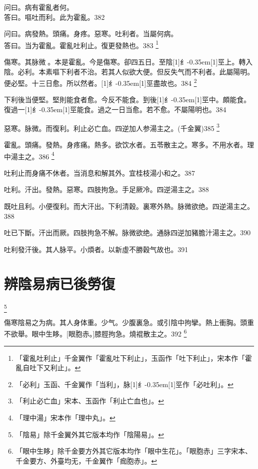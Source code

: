 \documentclass[11pt,oneside,b5paper]{ctexbook}
\begin{document}
\begin{flushleft}
问曰。病有霍亂者何。\\
答曰。嘔吐而利。此为霍亂。382

问曰。病發熱。頭痛。身疼。惡寒。吐利者。当屬何病。\\
答曰。当为霍亂。霍亂吐利止。復更發熱也。383
\footnote{「霍亂吐利止」千金翼作「霍亂吐下利止」，玉函作「吐下利止」，宋本作「霍亂自吐下又利止」。}

傷寒。其脉微{𬈧}。本是霍亂。今是傷寒。卻四五日。至陰{\hbox{\scalebox{0.68}[1]{纟}\kern-0.35em\scalebox{0.64}[1]{巠}}}上。轉入陰。必利。本素嘔下利者不治。若其人似欲大便。但反失气而不利者。此屬陽明。便必堅。十三日愈。所以然者。{\hbox{\scalebox{0.68}[1]{纟}\kern-0.35em\scalebox{0.64}[1]{巠}}}盡故也。384
\footnote{「必利」玉函、千金翼作「当利」，脉{\hbox{\scalebox{0.68}[1]{纟}\kern-0.35em\scalebox{0.64}[1]{巠}}}作「必吐利」。}

下利後当便堅。堅則能食者愈。今反不能食。到後{\hbox{\scalebox{0.68}[1]{纟}\kern-0.35em\scalebox{0.64}[1]{巠}}}中。頗能食。復過一{\hbox{\scalebox{0.68}[1]{纟}\kern-0.35em\scalebox{0.64}[1]{巠}}}能食。過之一日当愈。若不愈。不屬陽明也。384

惡寒。脉微。而復利。利止必亡血。四逆加人参湯主之。(千金翼)385
\footnote{「利止必亡血」宋本、玉函作「利止亡血也」。}

霍亂。頭痛。發熱。身疼痛。熱多。欲饮水者。五苓散主之。寒多。不用水者。理中湯主之。386
\footnote{「理中湯」宋本作「理中丸」。}

吐利止而身痛不休者。当消息和解其外。宜桂枝湯小和之。387

吐利。汗出。發熱。惡寒。四肢拘急。手足厥冷。四逆湯主之。388

既吐且利。小便復利。而大汗出。下利清穀。裏寒外熱。脉微欲绝。四逆湯主之。388

吐已下斷。汗出而厥。四肢拘急不解。脉微欲绝。通脉四逆加豬膽汁湯主之。390

吐利發汗後。其人脉平。小煩者。以新虛不勝穀气故也。391

\chapter{辨陰易病已後勞復}

\footnote{「陰易」除千金翼外其它版本均作「陰陽易」。}

傷寒陰易之为病。其人身体重。少气。少腹裏急。或引陰中拘攣。熱上衝胸。頭重不欲舉。眼中生眵。[眼胞赤。]膝脛拘急。燒裩散主之。392
\footnote{「眼中生眵」除千金要方外其它版本均作「眼中生花」。「眼胞赤」三字宋本、千金要方、外臺均无，千金翼作「痂胞赤」。}


\end{flushleft}
\end{document}
